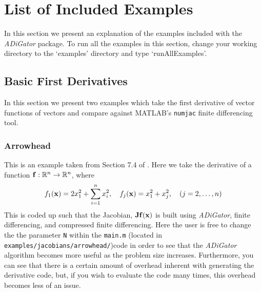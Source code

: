 \documentclass[10pt,pdftex]{article}
\begin{document}
\section{List of Included Examples}
In this section we present an explanation of the examples included with the \emph{ADiGator} package.
To run all the examples in this section, change your working directory to the `examples' directory and type `runAllExamples'.
\subsection{Basic First Derivatives}
In this section we present two examples which take the first derivative of vector functions of vectors and compare against MATLAB's \texttt{numjac} finite differencing tool.
\subsubsection{Arrowhead}
This is an example taken from Section 7.4 of \cite{Griewank1}. Here we take the derivative of a function $\mathbf{f}: \mathbb{R}^n \rightarrow \mathbb{R}^n$, where
\begin{equation}
f_1(\mathbf{x}) = 2x^2_1+ \sum^n_{i=1}x_i^2, \quad f_j(\mathbf{x}) = x_1^2 + x_j^2, \quad (j = 2,\dots,n)
\end{equation}
This is coded up such that the Jacobian, $\mathbf{J}\mathbf{f}(\mathbf{x})$ is built using \emph{ADiGator}, finite differencing, and compressed finite differencing. Here the user is free to change the the parameter \texttt{N} within the \texttt{main.m} (located in \texttt{examples/jacobians/arrowhead/})code in order to see that the \emph{ADiGator} algorithm becomes more useful as the problem size increases. Furthermore, you can see that there is a certain amount of overhead inherent with generating the derivative code, but, if you wish to evaluate the code many times, this overhead becomes less of an issue.
\end{document}

